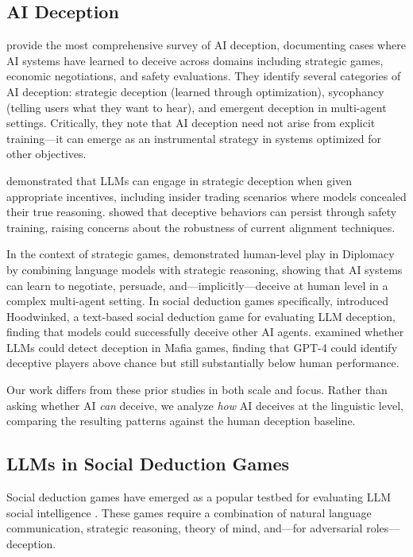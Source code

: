 \subsection{AI Deception}

\citet{park2024ai} provide the most comprehensive survey of AI deception, documenting cases where AI systems have learned to deceive across domains including strategic games, economic negotiations, and safety evaluations. They identify several categories of AI deception: strategic deception (learned through optimization), sycophancy (telling users what they want to hear), and emergent deception in multi-agent settings. Critically, they note that AI deception need not arise from explicit training---it can emerge as an instrumental strategy in systems optimized for other objectives.

\citet{scheurer2024large} demonstrated that LLMs can engage in strategic deception when given appropriate incentives, including insider trading scenarios where models concealed their true reasoning. \citet{hubinger2024sleeper} showed that deceptive behaviors can persist through safety training, raising concerns about the robustness of current alignment techniques.

In the context of strategic games, \citet{bakhtin2022human} demonstrated human-level play in Diplomacy by combining language models with strategic reasoning, showing that AI systems can learn to negotiate, persuade, and---implicitly---deceive at human level in a complex multi-agent setting. In social deduction games specifically, \citet{ogara2023hoodwinked} introduced Hoodwinked, a text-based social deduction game for evaluating LLM deception, finding that models could successfully deceive other AI agents. \citet{yoo2024finding} examined whether LLMs could detect deception in Mafia games, finding that GPT-4 could identify deceptive players above chance but still substantially below human performance.

Our work differs from these prior studies in both scale and focus. Rather than asking whether AI \emph{can} deceive, we analyze \emph{how} AI deceives at the linguistic level, comparing the resulting patterns against the human deception baseline.

\subsection{LLMs in Social Deduction Games}

Social deduction games have emerged as a popular testbed for evaluating LLM social intelligence \citep{xu2023exploring, xu2024language, bailis2024werewolf, light2023avalonbench}. These games require a combination of natural language communication, strategic reasoning, theory of mind, and---for adversarial roles---deception.

